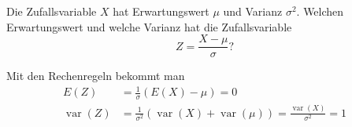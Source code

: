 Die Zufallsvariable $X$ hat Erwartungswert $\mu$ und Varianz $\sigma^2$.
Welchen Erwartungswert und welche Varianz hat die Zufallsvariable
\[
Z=\frac{X-\mu}{\sigma}?
\]

\begin{loesung}
Mit den Rechenregeln bekommt man
\begin{align*}
E(Z)&=
\frac1{\sigma}(E(X)-\mu)=0\\
\operatorname{var}(Z)&=
\frac1{\sigma^2}(\operatorname{var}(X)+\operatorname{var}(\mu))
=
\frac{\operatorname{var}(X)}{\sigma^2}=1
\end{align*}
\end{loesung}

